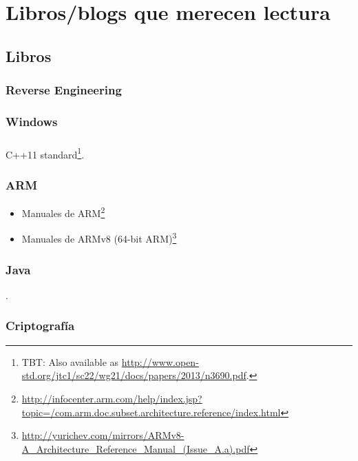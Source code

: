 \part{Libros/blogs que merecen lectura}

\chapter{Libros}

\section{Reverse Engineering}



\section{Windows}



\section{\CCpp}

C++11 standard\footnote{\ac{TBT}: Also available as \url{http://www.open-std.org/jtc1/sc22/wg21/docs/papers/2013/n3690.pdf}.}.

\section{ARM}

\begin{itemize}
\item Manuales de ARM\footnote{\AlsoAvailableAs \url{http://infocenter.arm.com/help/index.jsp?topic=/com.arm.doc.subset.architecture.reference/index.html}}

\item Manuales de ARMv8 (64-bit ARM)\footnote{\AlsoAvailableAs \url{http://yurichev.com/mirrors/ARMv8-A_Architecture_Reference_Manual_(Issue_A.a).pdf}}
\end{itemize}

\section{Java}

\Javabook.

\section{Criptograf\'ia}

